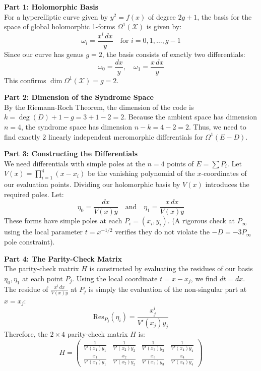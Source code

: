 \documentclass[11pt, a4paper, twoside]{article}
\newcommand{\X}{\mathcal{X}}
\begin{document}
	\begin{solutionbox}
		\textbf{Part 1: Holomorphic Basis}\\
		For a hyperelliptic curve given by $y^2 = f(x)$ of degree $2g+1$, the basis for the space of global holomorphic 1-forms $\Omega^1(\X)$ is given by:
		$$ \omega_i = \frac{x^i \,dx}{y} \quad \text{for } i = 0, 1, \dots, g-1 $$
		Since our curve has genus $g=2$, the basis consists of exactly two differentials:
		$$ \omega_0 = \frac{dx}{y}, \quad \omega_1 = \frac{x \,dx}{y} $$
		This confirms $\dim \Omega^1(\X) = g = 2$.
		
		\vspace{1em}
		\textbf{Part 2: Dimension of the Syndrome Space}\\
		By the Riemann-Roch Theorem, the dimension of the code is $k = \deg(D) + 1 - g = 3 + 1 - 2 = 2$. 
		Because the ambient space has dimension $n=4$, the syndrome space has dimension $n - k = 4 - 2 = 2$. 
		Thus, we need to find exactly $2$ linearly independent meromorphic differentials for $\Omega^1(E-D)$.
		
		\vspace{1em}
		\textbf{Part 3: Constructing the Differentials}\\
		We need differentials with simple poles at the $n=4$ points of $E = \sum P_i$. Let $V(x) = \prod_{i=1}^4 (x - x_i)$ be the vanishing polynomial of the $x$-coordinates of our evaluation points. Dividing our holomorphic basis by $V(x)$ introduces the required poles. 
		Let:
		$$ \eta_0 = \frac{dx}{V(x)y} \quad \text{and} \quad \eta_1 = \frac{x \,dx}{V(x)y} $$
		These forms have simple poles at each $P_i = (x_i, y_i)$. (A rigorous check at $P_\infty$ using the local parameter $t = x^{-1/2}$ verifies they do not violate the $-D = -3P_\infty$ pole constraint).
		
		\vspace{1em}
		\textbf{Part 4: The Parity-Check Matrix}\\
		The parity-check matrix $H$ is constructed by evaluating the residues of our basis $\eta_0, \eta_1$ at each point $P_j$. 
		Using the local coordinate $t = x - x_j$, we find $dt = dx$. The residue of $\frac{x^i \,dx}{V(x)y}$ at $P_j$ is simply the evaluation of the non-singular part at $x = x_j$:
		$$ \text{Res}_{P_j}(\eta_i) = \frac{x_j^i}{V'(x_j) y_j} $$
		Therefore, the $2 \times 4$ parity-check matrix $H$ is:
		$$ 
		H = 
		\begin{pmatrix}
			\frac{1}{V'(x_1) y_1} & \frac{1}{V'(x_2) y_2} & \frac{1}{V'(x_3) y_3} & \frac{1}{V'(x_4) y_4} \\[8pt]
			\frac{x_1}{V'(x_1) y_1} & \frac{x_2}{V'(x_2) y_2} & \frac{x_3}{V'(x_3) y_3} & \frac{x_4}{V'(x_4) y_4}
		\end{pmatrix}
		$$
	\end{solutionbox}
	
\end{document}
